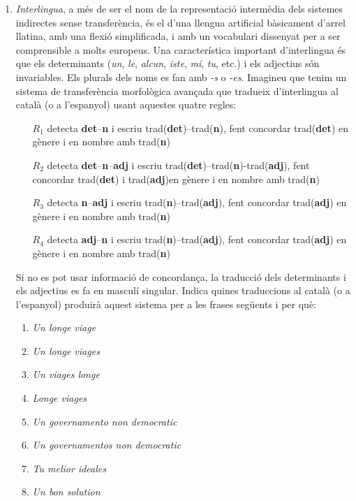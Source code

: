 \begin{enumerate}
\item \emph{Interlingua}, a més de ser el nom de la representació
  intermèdia dels sistemes indirectes sense transferència, és el d'una
  llengua artificial bàsicament d'arrel llatina, amb una flexió
  simplificada, i amb un vocabulari dissenyat per a ser comprensible a
  molts europeus.  Una característica important d'interlingua és que
  els determinants (\emph{un}, \emph{le}, \emph{alcun}, \emph{iste},
  \emph{mi}, \emph{tu}, etc.) i els adjectius són invariables. Els
  plurals dels noms es fan amb \emph{-s} o \emph{-es}.  Imagineu que
  tenim un sistema de transferència morfològica avançada que tradueix
  d'interlingua al català (o a l'espanyol) usant aquestes quatre
  regles:
  \begin{itemize}
  \item[$R_1$] detecta \textbf{det}--\textbf{n} i escriu
    \textsf{trad}(\textbf{det})--\textsf{trad}(\textbf{n}), fent
    concordar \textsf{trad}(\textbf{det}) en gènere i en nombre amb
    \textsf{trad}(\textbf{n})
  \item[$R_2$] detecta \textbf{det}--\textbf{n}--\textbf{adj} i escriu
    \textsf{trad}(\textbf{det})--\textsf{trad}(\textbf{n})-\textsf{trad}(\textbf{adj}),
    fent concordar \textsf{trad}(\textbf{det}) i
    \textsf{trad}(\textbf{adj})en gènere i en nombre amb
    \textsf{trad}(\textbf{n})
  \item[$R_3$] detecta \textbf{n}--\textbf{adj} i escriu
    \textsf{trad}(\textbf{n})--\textsf{trad}(\textbf{adj}), fent
    concordar \textsf{trad}(\textbf{adj}) en gènere i en nombre amb
    \textsf{trad}(\textbf{n})
  \item[$R_4$] detecta \textbf{adj}--\textbf{n} i escriu
    \textsf{trad}(\textbf{n})--\textsf{trad}(\textbf{adj}), fent
    concordar \textsf{trad}(\textbf{adj}) en gènere i en nombre amb
    \textsf{trad}(\textbf{n})
  \end{itemize}
  Si no es pot usar informació de concordança, la traducció dels
  determinants i els adjectius es fa en masculí singular.  Indica
  quines traduccions al català (o a l'espanyol) produirà aquest
  sistema per a les frases següents i per què:
  \begin{enumerate}
  \item \emph{Un longe viage}
  \item \emph{Un longe viages}
  \item \emph{Un viages longe}
  \item \emph{Longe viages}
  \item \emph{Un governamento non democratic}
  \item \emph{Un governamentos non democratic}
  \item \emph{Tu melior ideales}
  \item \emph{Un bon solution}
  \end{enumerate}


\end{enumerate}
